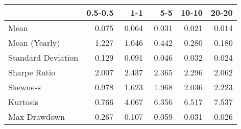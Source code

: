 \begin{tabular}{lrrrrr}
\toprule
{} &  0.5-0.5 &    1-1 &    5-5 &  10-10 &  20-20 \\
\midrule
Mean               &    0.075 &  0.064 &  0.031 &  0.021 &  0.014 \\
Mean (Yearly)      &    1.227 &  1.046 &  0.442 &  0.280 &  0.180 \\
Standard Deviation &    0.129 &  0.091 &  0.046 &  0.032 &  0.024 \\
Sharpe Ratio       &    2.007 &  2.437 &  2.365 &  2.296 &  2.062 \\
Skewness           &    0.978 &  1.623 &  1.968 &  2.036 &  2.223 \\
Kurtosis           &    0.766 &  4.067 &  6.356 &  6.517 &  7.537 \\
Max Drawdown       &   -0.267 & -0.107 & -0.059 & -0.031 & -0.026 \\
\bottomrule
\end{tabular}
